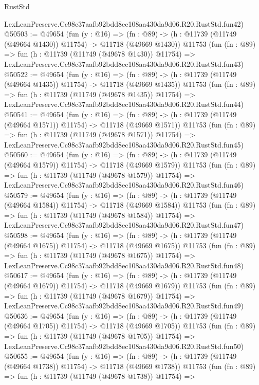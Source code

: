 \begin{lexlean}{RustStd}
\begin{coremodule}
    LexLeanPreserve.Cc98c37aafb92bdd8ec108aa430da9d06.R20.RustStd.fun42)
@50503 := @49654
    (fun (y : @16) =>
    (fn : @89) -> (h : @11739 (@11749 (@49664 @1430)) @11754) -> @11718 (@49669 @1430))
    @11753
    (fun (fn : @89) =>
    fun (h : @11739 (@11749 (@49678 @1430)) @11754) =>
    LexLeanPreserve.Cc98c37aafb92bdd8ec108aa430da9d06.R20.RustStd.fun43)
@50522 := @49654
    (fun (y : @16) =>
    (fn : @89) -> (h : @11739 (@11749 (@49664 @1435)) @11754) -> @11718 (@49669 @1435))
    @11753
    (fun (fn : @89) =>
    fun (h : @11739 (@11749 (@49678 @1435)) @11754) =>
    LexLeanPreserve.Cc98c37aafb92bdd8ec108aa430da9d06.R20.RustStd.fun44)
@50541 := @49654
    (fun (y : @16) =>
    (fn : @89) -> (h : @11739 (@11749 (@49664 @1571)) @11754) -> @11718 (@49669 @1571))
    @11753
    (fun (fn : @89) =>
    fun (h : @11739 (@11749 (@49678 @1571)) @11754) =>
    LexLeanPreserve.Cc98c37aafb92bdd8ec108aa430da9d06.R20.RustStd.fun45)
@50560 := @49654
    (fun (y : @16) =>
    (fn : @89) -> (h : @11739 (@11749 (@49664 @1579)) @11754) -> @11718 (@49669 @1579))
    @11753
    (fun (fn : @89) =>
    fun (h : @11739 (@11749 (@49678 @1579)) @11754) =>
    LexLeanPreserve.Cc98c37aafb92bdd8ec108aa430da9d06.R20.RustStd.fun46)
@50579 := @49654
    (fun (y : @16) =>
    (fn : @89) -> (h : @11739 (@11749 (@49664 @1584)) @11754) -> @11718 (@49669 @1584))
    @11753
    (fun (fn : @89) =>
    fun (h : @11739 (@11749 (@49678 @1584)) @11754) =>
    LexLeanPreserve.Cc98c37aafb92bdd8ec108aa430da9d06.R20.RustStd.fun47)
@50598 := @49654
    (fun (y : @16) =>
    (fn : @89) -> (h : @11739 (@11749 (@49664 @1675)) @11754) -> @11718 (@49669 @1675))
    @11753
    (fun (fn : @89) =>
    fun (h : @11739 (@11749 (@49678 @1675)) @11754) =>
    LexLeanPreserve.Cc98c37aafb92bdd8ec108aa430da9d06.R20.RustStd.fun48)
@50617 := @49654
    (fun (y : @16) =>
    (fn : @89) -> (h : @11739 (@11749 (@49664 @1679)) @11754) -> @11718 (@49669 @1679))
    @11753
    (fun (fn : @89) =>
    fun (h : @11739 (@11749 (@49678 @1679)) @11754) =>
    LexLeanPreserve.Cc98c37aafb92bdd8ec108aa430da9d06.R20.RustStd.fun49)
@50636 := @49654
    (fun (y : @16) =>
    (fn : @89) -> (h : @11739 (@11749 (@49664 @1705)) @11754) -> @11718 (@49669 @1705))
    @11753
    (fun (fn : @89) =>
    fun (h : @11739 (@11749 (@49678 @1705)) @11754) =>
    LexLeanPreserve.Cc98c37aafb92bdd8ec108aa430da9d06.R20.RustStd.fun50)
@50655 := @49654
    (fun (y : @16) =>
    (fn : @89) -> (h : @11739 (@11749 (@49664 @1738)) @11754) -> @11718 (@49669 @1738))
    @11753
    (fun (fn : @89) =>
    fun (h : @11739 (@11749 (@49678 @1738)) @11754) =>

\end{coremodule}
\end{lexlean}
